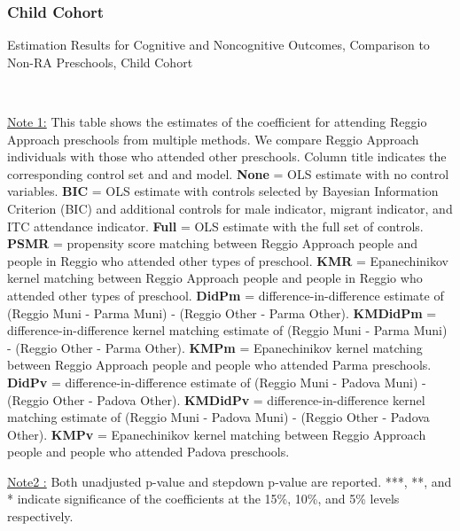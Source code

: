\subsubsection{Child Cohort}

\begin{table}[H] \caption{Estimation Results for Cognitive and Noncognitive Outcomes, Comparison to Non-RA Preschools, Child Cohort} \label{combined_child_CN_Other}
\scalebox{0.59}{}
\vspace{1ex} \\
\footnotesize\raggedright{\underline{Note 1:} This table shows the estimates of the coefficient for attending Reggio Approach preschools from multiple methods. We compare Reggio Approach individuals with those who attended other preschools. Column title indicates the corresponding control set and and model. \textbf{None} = OLS estimate with no control variables. \textbf{BIC} = OLS estimate with controls selected by Bayesian Information Criterion (BIC) and additional controls for male indicator, migrant indicator, and ITC attendance indicator. \textbf{Full} = OLS estimate with the full set of controls. \textbf{PSMR} =  propensity score matching between Reggio Approach people and people in Reggio who attended other types of preschool. \textbf{KMR} = Epanechinikov kernel matching between Reggio Approach people and people in Reggio who attended other types of preschool. \textbf{DidPm} = difference-in-difference estimate of (Reggio Muni - Parma Muni) - (Reggio Other - Parma Other). \textbf{KMDidPm} = difference-in-difference kernel matching estimate of (Reggio Muni - Parma Muni) - (Reggio Other - Parma Other).   \textbf{KMPm} = Epanechinikov kernel matching between Reggio Approach people and people who attended Parma preschools. \textbf{DidPv} = difference-in-difference estimate of (Reggio Muni - Padova Muni) - (Reggio Other - Padova Other). \textbf{KMDidPv} = difference-in-difference kernel matching estimate of (Reggio Muni - Padova Muni) - (Reggio Other - Padova Other).  \textbf{KMPv} = Epanechinikov kernel matching between Reggio Approach people and people who attended Padova preschools.}

\footnotesize\raggedright{\underline{Note2 :} Both unadjusted p-value and stepdown p-value are reported. ***, **, and * indicate significance of the coefficients at the 15\%, 10\%, and 5\% levels respectively.}
\end{table}


